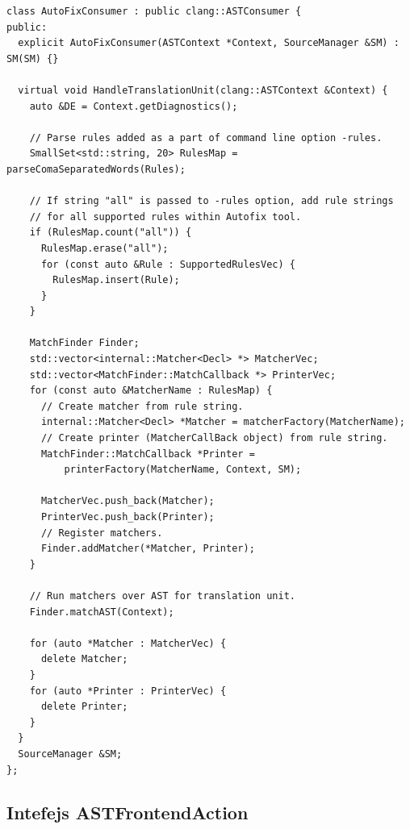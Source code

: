 \documentclass[12pt,oneside]{memoir}
\begin{document}
\begin{lstlisting}[style=customc, basicstyle=\tiny, caption={Implementacija klase \texttt{AutoFixConsumer} u okviru alata \textit{Autofix}.}, label=lst:labelConsumer]
class AutoFixConsumer : public clang::ASTConsumer {
public:
  explicit AutoFixConsumer(ASTContext *Context, SourceManager &SM) : SM(SM) {}

  virtual void HandleTranslationUnit(clang::ASTContext &Context) {
    auto &DE = Context.getDiagnostics();

    // Parse rules added as a part of command line option -rules.
    SmallSet<std::string, 20> RulesMap = parseComaSeparatedWords(Rules);

    // If string "all" is passed to -rules option, add rule strings
    // for all supported rules within Autofix tool.
    if (RulesMap.count("all")) {
      RulesMap.erase("all");
      for (const auto &Rule : SupportedRulesVec) {
        RulesMap.insert(Rule);
      }
    }

    MatchFinder Finder;
    std::vector<internal::Matcher<Decl> *> MatcherVec;
    std::vector<MatchFinder::MatchCallback *> PrinterVec;
    for (const auto &MatcherName : RulesMap) {
      // Create matcher from rule string.
      internal::Matcher<Decl> *Matcher = matcherFactory(MatcherName);
      // Create printer (MatcherCallBack object) from rule string.
      MatchFinder::MatchCallback *Printer =
          printerFactory(MatcherName, Context, SM);

      MatcherVec.push_back(Matcher);
      PrinterVec.push_back(Printer);
      // Register matchers.
      Finder.addMatcher(*Matcher, Printer);
    }

    // Run matchers over AST for translation unit.
    Finder.matchAST(Context);

    for (auto *Matcher : MatcherVec) {
      delete Matcher;
    }
    for (auto *Printer : PrinterVec) {
      delete Printer;
    }
  }
  SourceManager &SM;
};
\end{lstlisting}

\subsection{Intefejs ASTFrontendAction}
\end{document}
